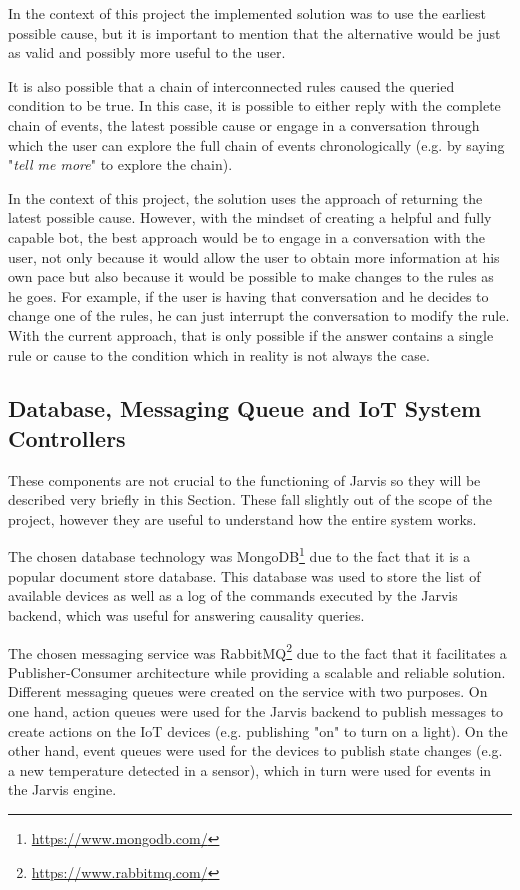 \documentclass[runningheads]{llncs}
\begin{document}
In the context of this project the implemented solution was to use the earliest possible cause, but it is important to mention that the alternative would be just as valid and possibly more useful to the user.

It is also possible that a chain of interconnected rules caused the queried condition to be true. In this case, it is possible to either reply with the complete chain of events, the latest possible cause or engage in a conversation through which the user can explore the full chain of events chronologically (e.g. by saying "\textit{tell me more}" to explore the chain).

In the context of this project, the solution uses the approach of returning the latest possible cause. However, with the mindset of creating a helpful and fully capable bot, the best approach would be to engage in a conversation with the user, not only because it would allow the user to obtain more information at his own pace but also because it would be possible to make changes to the rules as he goes. For example, if the user is having that conversation and he decides to change one of the rules, he can just interrupt the conversation to modify the rule. With the current approach, that is only possible if the answer contains a single rule or cause to the condition which in reality is not always the case.

\subsection{Database, Messaging Queue and IoT System Controllers}

These components are not crucial to the functioning of Jarvis so they will be described very briefly in this Section. These fall slightly out of the scope of the project, however they are useful to understand how the entire system works.

The chosen database technology was MongoDB\footnote{\url{https://www.mongodb.com/}} due to the fact that it is a popular document store database. This database was used to store the list of available devices as well as a log of the commands executed by the Jarvis backend, which was useful for answering causality queries.

The chosen messaging service was RabbitMQ\footnote{\url{https://www.rabbitmq.com/}} due to the fact that it facilitates a Publisher-Consumer architecture while providing a scalable and reliable solution. Different messaging queues were created on the service with two purposes. On one hand, action queues were used for the Jarvis backend to publish messages to create actions on the IoT devices (e.g. publishing "on" to turn on a light). On the other hand, event queues were used for the devices to publish state changes (e.g. a new temperature detected in a sensor), which in turn were used for events in the Jarvis engine.
\end{document}
